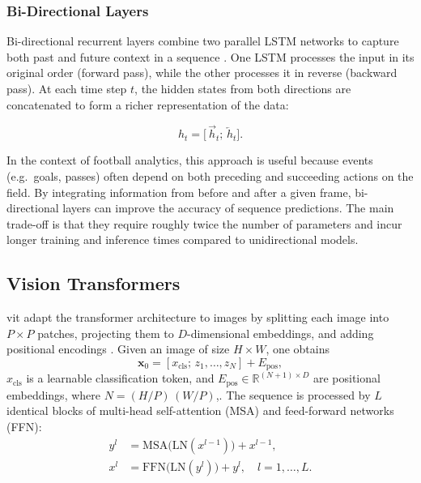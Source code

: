 \subsubsection{Bi-Directional Layers}
\label{ssec:bi_directional_layers}

Bi-directional recurrent layers combine two parallel LSTM networks to capture both past and future context in a sequence \cite{radhakrishnan_bi_lstm_2023, bhogal_human_2023}. One LSTM processes the input in its original order (forward pass), while the other processes it in reverse (backward pass). At each time step \(t\), the hidden states from both directions are concatenated to form a richer representation of the data:

\[
h_t = \bigl[\,\overrightarrow{h}_t;\,\overleftarrow{h}_t\bigr].
\]

In the context of football analytics, this approach is useful because events (e.g.\ goals, passes) often depend on both preceding and succeeding actions on the field. By integrating information from before and after a given frame, bi-directional layers can improve the accuracy of sequence predictions. The main trade-off is that they require roughly twice the number of parameters and incur longer training and inference times compared to unidirectional models.


\subsection{Vision Transformers}
\label{ssec:vision_transformers}

\acrfull{vit} adapt the transformer architecture \cite{vaswani_attention_2017}  to images by splitting each image into $P\times P$ patches, projecting them to $D$-dimensional embeddings, and adding positional encodings \cite{dosovitskiy_image_transformer_2021}. Given an image of size $H\times W$, one obtains
\[
\mathbf{x}_0 = [x_{\text{cls}};\,z_1,\dots,z_N] + E_{\text{pos}},
\]
$x_{\text{cls}}$ is a learnable classification token, and $E_{\text{pos}}\in\mathbb{R}^{(N+1)\times D}$ are positional embeddings, where $N=(H/P)\,(W/P)$,. The sequence is processed by $L$ identical blocks of multi-head self-attention (MSA) and feed-forward networks (FFN):
\begin{align*}
y^l &= \mathrm{MSA}\bigl(\mathrm{LN}(x^{l-1})\bigr) + x^{l-1},\\
x^l &= \mathrm{FFN}\bigl(\mathrm{LN}(y^l)\bigr) + y^l,\quad l=1,\dots,L.
\end{align*}

